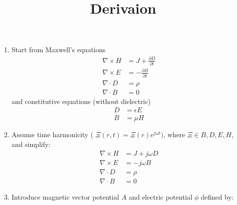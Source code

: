 \documentclass{article}
\begin{document}
\title{Derivaion}

\begin{enumerate}
    \item   Start from Maxwell's equations
            \begin{subequations}\label{eq:MaxwellTime}
                \begin{align}
                    \nabla \times H &= J + \frac{\partial D}{\partial t} \label{eq:AmpereMaxwell} \\
                    \nabla \times E &= - \frac{\partial B}{\partial t} \label{eq:MaxwellFaraday} \\
                    \nabla \cdot D &= \rho \label{eq:GaussElectric} \\
                    \nabla \cdot B &= 0 \label{eq:GaussMagnetic}
                \end{align}
            \end{subequations}
            and constitutive equations (without dielectric)
            \begin{subequations}\label{eq:Constitutive}
                \begin{align}
                    D &= \epsilon E \label{eq:ConstitutiveElectric} \\
                    B &= \mu H \label{eq:ConstitutiveMagnetic}
                \end{align}
            \end{subequations}
    \item   Assume time harmonicity ( $\Xi(r,t) = \Xi(r)e^{j \omega t})$, where $\Xi \in { B,D,E,H }$, and simplify:
            \begin{subequations}\label{eq:MaxwellTimeTH}
                \begin{align}
                    \nabla \times H &= J + j \omega D \label{eq:AmpereMaxwellTH} \\
                    \nabla \times E &= - j \omega B \label{eq:MaxwellFaradayTH} \\
                    \nabla \cdot D &= \rho \label{eq:GaussElectricTH} \\
                    \nabla \cdot B &= 0 \label{eq:GaussMagneticTH}
                \end{align}
            \end{subequations}
    \item   Introduce magnetic vector potential $A$ and electric potential $\phi$ defined by:
            \begin{subequations}\label{eq:Potentials}

\end{subequations}
\end{enumerate}
\end{document}
